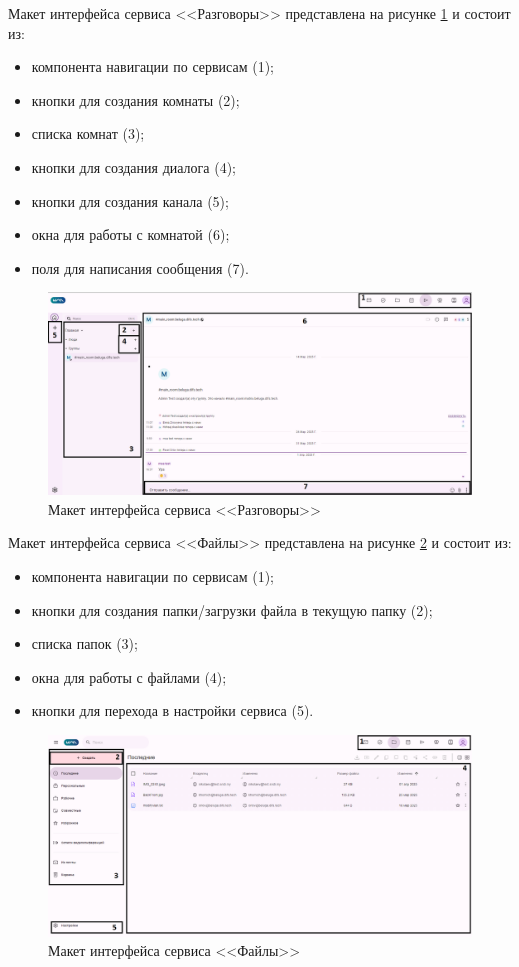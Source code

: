 Макет интерфейса сервиса <<Разговоры>> представлена на рисунке \ref{templ:image8} и состоит из:
\begin{itemize}
  \item компонента навигации по сервисам (1);
  \item кнопки для создания комнаты (2);
  \item списка комнат (3);
  \item кнопки для создания диалога (4);
  \item кнопки для создания канала (5);
  \item окна для работы с комнатой (6);
  \item поля для написания сообщения (7).
\end{itemize}
\begin{figure}[H]
	\centering
	\includegraphics[width=1\linewidth]{images/разговоры}
	\caption{Макет интерфейса сервиса <<Разговоры>>}
	\label{templ:image8}
\end{figure}

Макет интерфейса сервиса <<Файлы>> представлена на рисунке \ref{templ:image9} и состоит из:
\begin{itemize}
  \item компонента навигации по сервисам (1);
  \item кнопки для создания папки/загрузки файла в текущую папку (2);
  \item списка папок (3);
  \item окна для работы с файлами (4);
  \item кнопки для перехода в настройки сервиса (5).
\end{itemize}
\begin{figure}[H]
	\centering
	\includegraphics[width=1\linewidth]{images/файлы}
	\caption{Макет интерфейса сервиса <<Файлы>>}
	\label{templ:image9}
\end{figure}

